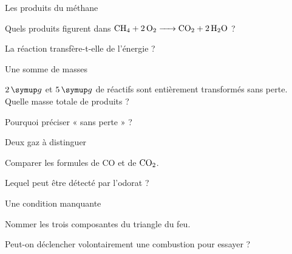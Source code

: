 \par\noindent\begin{minipage}{\linewidth}
\begin{exercice}[1]{Les produits du méthane}
\begin{questions}
\item Quels produits figurent dans $\ce{CH4 + 2O2 -> CO2 + 2H2O}$ ?
\item La réaction transfère-t-elle de l’énergie ?
\end{questions}
\end{exercice}
\end{minipage}
\par\noindent\begin{minipage}{\linewidth}
\begin{exercice}[1]{Une somme de masses}
\begin{questions}
\item $2\unite g$ et $5\unite g$ de réactifs sont entièrement transformés sans perte. Quelle masse totale de produits ?
\item Pourquoi préciser « sans perte » ?
\end{questions}
\end{exercice}
\end{minipage}
\par\noindent\begin{minipage}{\linewidth}
\begin{exercice}[1]{Deux gaz à distinguer}
\begin{questions}
\item Comparer les formules de CO et de $\ce{CO2}$.
\item Lequel peut être détecté par l’odorat ?
\end{questions}
\end{exercice}
\end{minipage}
\par\noindent\begin{minipage}{\linewidth}
\begin{exercice}[1]{Une condition manquante}
\begin{questions}
\item Nommer les trois composantes du triangle du feu.
\item Peut-on déclencher volontairement une combustion pour essayer ?
\end{questions}
\end{exercice}
\end{minipage}
\clearpage{}
